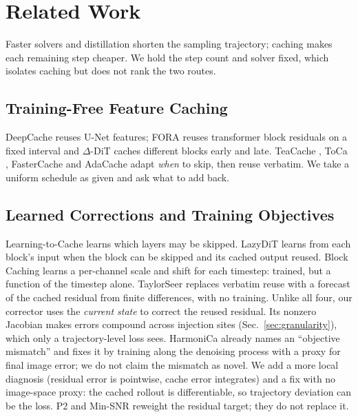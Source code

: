 \documentclass[conference,compsoc]{IEEEtran}
\begin{document}
\section{Related Work}

Faster solvers \cite{song2020ddim,lu2022dpmsolverpp} and distillation
\cite{song2023consistency} shorten the sampling trajectory; caching makes each
remaining step cheaper. We hold the step count and solver fixed, which isolates
caching but does not rank the two routes.

\subsection{Training-Free Feature Caching}
DeepCache \cite{ma2024deepcache} reuses U-Net features; FORA
\cite{selvaraju2024fora} reuses transformer block residuals on a fixed interval
and $\Delta$-DiT \cite{chen2024deltadit} caches different blocks early and late.
TeaCache \cite{liu2024teacache}, ToCa \cite{zou2024toca}, FasterCache
\cite{lv2024fastercache} and AdaCache \cite{kahatapitiya2024adacache} adapt
\emph{when} to skip, then reuse verbatim. We take a uniform schedule as given
and ask what to add back.

\subsection{Learned Corrections and Training Objectives}
Learning-to-Cache \cite{ma2024l2c} learns which layers may be skipped.
LazyDiT \cite{shen2025lazydit} learns from each block's input when the block can be skipped and its cached output reused. Block Caching
\cite{wimbauer2024blockcaching} learns a per-channel scale and shift for each timestep: trained, but a function of the timestep alone. TaylorSeer
\cite{liu2025taylorseer} replaces verbatim reuse with a forecast of the cached residual from finite differences, with no training. Unlike all four, our corrector uses the \emph{current state} to correct the
reused residual. Its nonzero Jacobian makes errors compound across injection
sites (Sec.~\ref{sec:granularity}), which only a trajectory-level loss sees.
HarmoniCa \cite{huang2025harmonica} already names an ``objective mismatch''
and fixes it by training along the denoising process with a proxy for final
image error; we do not claim the mismatch as novel. We add a more local
diagnosis (residual error is pointwise, cache error integrates) and a fix with
no image-space proxy: the cached rollout is differentiable, so trajectory
deviation can be the loss. P2 \cite{choi2022p2} and Min-SNR
\cite{hang2023minsnr} reweight the residual target; they do not replace it.
\end{document}
